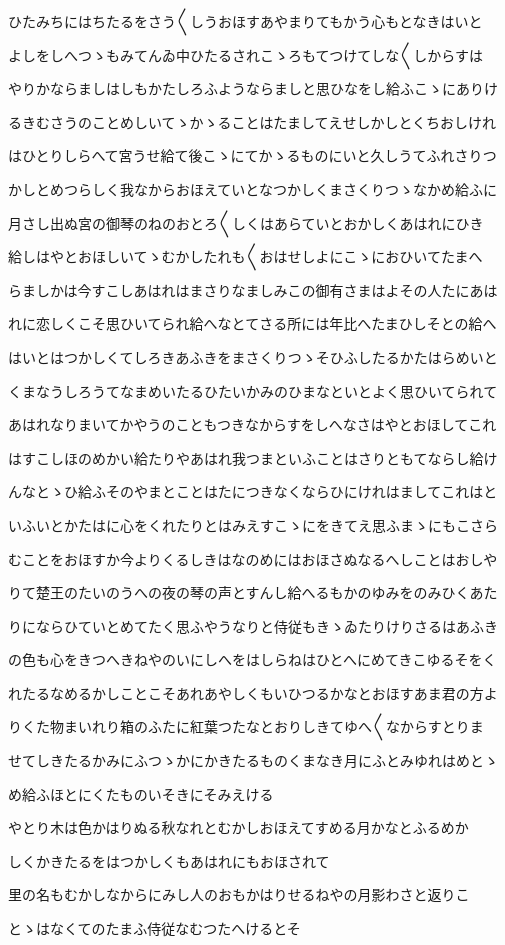 \documentclass[a4paper,11pt,landscape]{ltjtarticle}
\begin{document}
ひたみちにはちたるをさう〱しうおほすあやまりてもかう心もとなきはいと
\par\medskip
よしをしへつゝもみてんゐ中ひたるされこゝろもてつけてしな〱しからすは
\par\medskip
やりかならましはしもかたしろふようならましと思ひなをし給ふこゝにありけ
\par\medskip
るきむさうのことめしいてゝかゝることはたましてえせしかしとくちおしけれ
\par\medskip
はひとりしらへて宮うせ給て後こゝにてかゝるものにいと久しうてふれさりつ
\par\medskip
かしとめつらしく我なからおほえていとなつかしくまさくりつゝなかめ給ふに
\par\medskip
月さし出ぬ宮の御琴のねのおとろ〱しくはあらていとおかしくあはれにひき
\par\medskip
給しはやとおほしいてゝむかしたれも〱おはせしよにこゝにおひいてたまへ
\par\medskip
らましかは今すこしあはれはまさりなましみこの御有さまはよその人たにあは
\par\medskip
れに恋しくこそ思ひいてられ給へなとてさる所には年比へたまひしそとの給へ
\par\medskip
はいとはつかしくてしろきあふきをまさくりつゝそひふしたるかたはらめいと
\par\medskip
くまなうしろうてなまめいたるひたいかみのひまなといとよく思ひいてられて
\par\medskip
あはれなりまいてかやうのこともつきなからすをしへなさはやとおほしてこれ
\par\medskip
はすこしほのめかい給たりやあはれ我つまといふことはさりともてならし給け
\par\medskip
んなとゝひ給ふそのやまとことはたにつきなくならひにけれはましてこれはと
\par\medskip
いふいとかたはに心をくれたりとはみえすこゝにをきてえ思ふまゝにもこさら
\par\medskip
むことをおほすか今よりくるしきはなのめにはおほさぬなるへしことはおしや
\par\medskip
りて楚王のたいのうへの夜の琴の声とすんし給へるもかのゆみをのみひくあた
\par\medskip
りにならひていとめてたく思ふやうなりと侍従もきゝゐたりけりさるはあふき
\par\medskip
の色も心をきつへきねやのいにしへをはしらねはひとへにめてきこゆるそをく
\par\medskip
れたるなめるかしことこそあれあやしくもいひつるかなとおほすあま君の方よ
\par\medskip
りくた物まいれり箱のふたに紅葉つたなとおりしきてゆへ〱なからすとりま
\par\medskip
せてしきたるかみにふつゝかにかきたるものくまなき月にふとみゆれはめとゝ
\par\medskip
め給ふほとにくたものいそきにそみえける
\par\medskip
やとり木は色かはりぬる秋なれとむかしおほえてすめる月かなとふるめか
\par\medskip
しくかきたるをはつかしくもあはれにもおほされて
\par\medskip
里の名もむかしなからにみし人のおもかはりせるねやの月影わさと返りこ
\par\medskip
とゝはなくてのたまふ侍従なむつたへけるとそ
\par\medskip
\end{document}

